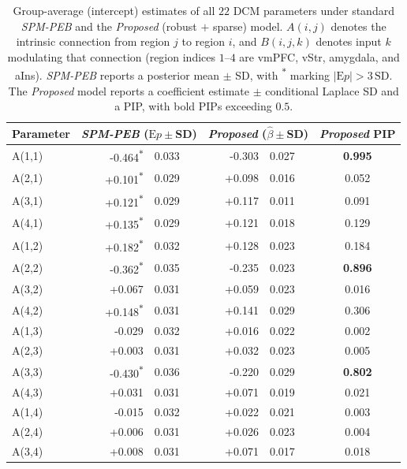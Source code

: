 \begin{table}[tbp]
\centering
\small
\caption{Group-average (intercept) estimates of all $22$ DCM parameters under standard \emph{SPM-PEB} and the \emph{Proposed} (robust $+$ sparse) model. $A(i,j)$ denotes the intrinsic connection from region $j$ to region $i$, and $B(i,j,k)$ denotes input $k$ modulating that connection (region indices $1$--$4$ are vmPFC, vStr, amygdala, and aIns). \emph{SPM-PEB} reports a posterior mean $\pm$ SD, with \textsuperscript{$\ast$} marking $|\mathrm{E}p|>3\,\mathrm{SD}$. The \emph{Proposed} model reports a coefficient estimate $\pm$ conditional Laplace SD and a PIP, with bold PIPs exceeding $0.5$.}
\label{tab:realparams}
\begin{tabular}{l r@{\,$\pm$\,}l r@{\,$\pm$\,}l c}
\toprule
Parameter & \multicolumn{2}{c}{\emph{SPM-PEB} ($\mathrm{E}p\pm$SD)} & \multicolumn{2}{c}{\emph{Proposed} ($\widehat{\beta}\pm$SD)} & \emph{Proposed} PIP \\
\midrule
A(1,1) & -0.464\textsuperscript{$\ast$} & 0.033 & -0.303 & 0.027 & \textbf{0.995} \\
A(2,1) & +0.101\textsuperscript{$\ast$} & 0.029 & +0.098 & 0.016 & 0.052 \\
A(3,1) & +0.121\textsuperscript{$\ast$} & 0.029 & +0.117 & 0.011 & 0.091 \\
A(4,1) & +0.135\textsuperscript{$\ast$} & 0.029 & +0.121 & 0.018 & 0.129 \\
A(1,2) & +0.182\textsuperscript{$\ast$} & 0.032 & +0.128 & 0.023 & 0.184 \\
A(2,2) & -0.362\textsuperscript{$\ast$} & 0.035 & -0.235 & 0.023 & \textbf{0.896} \\
A(3,2) & +0.067 & 0.031 & +0.059 & 0.023 & 0.016 \\
A(4,2) & +0.148\textsuperscript{$\ast$} & 0.031 & +0.141 & 0.029 & 0.306 \\
A(1,3) & -0.029 & 0.032 & +0.016 & 0.022 & 0.002 \\
A(2,3) & +0.003 & 0.031 & +0.032 & 0.023 & 0.005 \\
A(3,3) & -0.430\textsuperscript{$\ast$} & 0.036 & -0.220 & 0.029 & \textbf{0.802} \\
A(4,3) & +0.031 & 0.031 & +0.071 & 0.019 & 0.021 \\
A(1,4) & -0.015 & 0.032 & +0.022 & 0.021 & 0.003 \\
A(2,4) & +0.006 & 0.031 & +0.026 & 0.023 & 0.004 \\
A(3,4) & +0.008 & 0.031 & +0.071 & 0.017 & 0.018 \\

\end{tabular}
\end{table}
